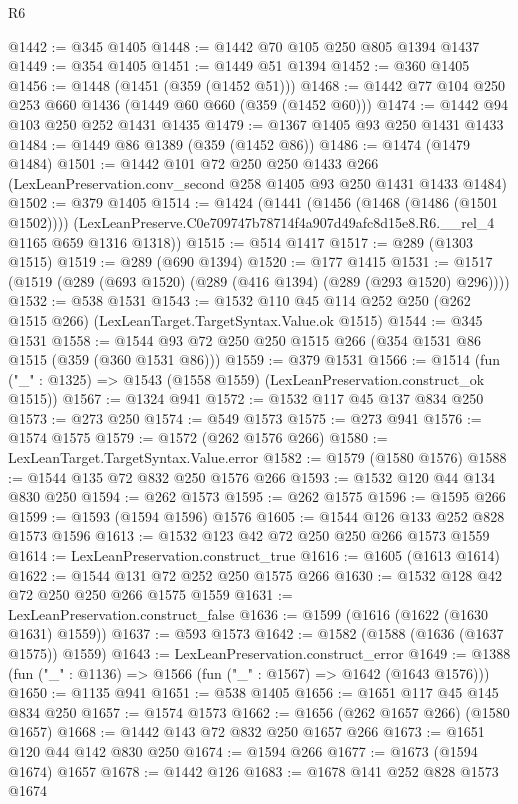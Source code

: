 \begin{lexlean}{R6}
\begin{coremodule}
@1442 := @345 @1405
@1448 := @1442 @70 @105 @250 @805 @1394 @1437
@1449 := @354 @1405
@1451 := @1449 @51 @1394
@1452 := @360 @1405
@1456 := @1448 (@1451 (@359 (@1452 @51)))
@1468 := @1442 @77 @104 @250 @253 @660 @1436 (@1449 @60 @660 (@359 (@1452 @60)))
@1474 := @1442 @94 @103 @250 @252 @1431 @1435
@1479 := @1367 @1405 @93 @250 @1431 @1433
@1484 := @1449 @86 @1389 (@359 (@1452 @86))
@1486 := @1474 (@1479 @1484)
@1501 := @1442
    @101
    @72
    @250
    @250
    @1433
    @266
    (LexLeanPreservation.conv_second @258 @1405 @93 @250 @1431 @1433 @1484)
@1502 := @379 @1405
@1514 := @1424
    (@1441
      (@1456 (@1468 (@1486 (@1501 @1502))))
      (LexLeanPreserve.C0e709747b78714f4a907d49afc8d15e8.R6.__rel_4 @1165 @659 @1316 @1318))
@1515 := @514 @1417
@1517 := @289 (@1303 @1515)
@1519 := @289 (@690 @1394)
@1520 := @177 @1415
@1531 := @1517 (@1519 (@289 (@693 @1520) (@289 (@416 @1394) (@289 (@293 @1520) @296))))
@1532 := @538 @1531
@1543 := @1532 @110 @45 @114 @252 @250 (@262 @1515 @266) (LexLeanTarget.TargetSyntax.Value.ok @1515)
@1544 := @345 @1531
@1558 := @1544 @93 @72 @250 @250 @1515 @266 (@354 @1531 @86 @1515 (@359 (@360 @1531 @86)))
@1559 := @379 @1531
@1566 := @1514 (fun ("_" : @1325) => @1543 (@1558 @1559) (LexLeanPreservation.construct_ok @1515))
@1567 := @1324 @941
@1572 := @1532 @117 @45 @137 @834 @250
@1573 := @273 @250
@1574 := @549 @1573
@1575 := @273 @941
@1576 := @1574 @1575
@1579 := @1572 (@262 @1576 @266)
@1580 := LexLeanTarget.TargetSyntax.Value.error
@1582 := @1579 (@1580 @1576)
@1588 := @1544 @135 @72 @832 @250 @1576 @266
@1593 := @1532 @120 @44 @134 @830 @250
@1594 := @262 @1573
@1595 := @262 @1575
@1596 := @1595 @266
@1599 := @1593 (@1594 @1596) @1576
@1605 := @1544 @126 @133 @252 @828 @1573 @1596
@1613 := @1532 @123 @42 @72 @250 @250 @266 @1573 @1559
@1614 := LexLeanPreservation.construct_true
@1616 := @1605 (@1613 @1614)
@1622 := @1544 @131 @72 @252 @250 @1575 @266
@1630 := @1532 @128 @42 @72 @250 @250 @266 @1575 @1559
@1631 := LexLeanPreservation.construct_false
@1636 := @1599 (@1616 (@1622 (@1630 @1631) @1559))
@1637 := @593 @1573
@1642 := @1582 (@1588 (@1636 (@1637 @1575)) @1559)
@1643 := LexLeanPreservation.construct_error
@1649 := @1388 (fun ("_" : @1136) => @1566 (fun ("_" : @1567) => @1642 (@1643 @1576)))
@1650 := @1135 @941
@1651 := @538 @1405
@1656 := @1651 @117 @45 @145 @834 @250
@1657 := @1574 @1573
@1662 := @1656 (@262 @1657 @266) (@1580 @1657)
@1668 := @1442 @143 @72 @832 @250 @1657 @266
@1673 := @1651 @120 @44 @142 @830 @250
@1674 := @1594 @266
@1677 := @1673 (@1594 @1674) @1657
@1678 := @1442 @126
@1683 := @1678 @141 @252 @828 @1573 @1674

\end{coremodule}
\end{lexlean}
